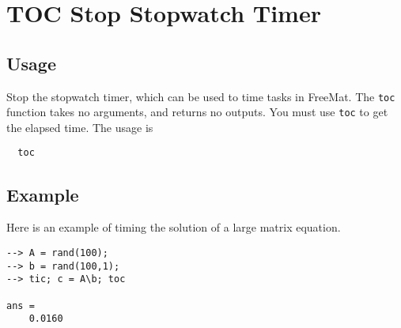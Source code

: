 \section{TOC Stop Stopwatch Timer}

\subsection{Usage}

Stop the stopwatch timer, which can be used to time tasks in FreeMat.
The \verb|toc| function takes no arguments, and returns no outputs.  You must use
\verb|toc| to get the elapsed time.  The usage is
\begin{verbatim}
  toc
\end{verbatim}
\subsection{Example}

Here is an example of timing the solution of a large matrix equation.
\begin{verbatim}
--> A = rand(100);
--> b = rand(100,1);
--> tic; c = A\b; toc

ans = 
    0.0160 
\end{verbatim}
